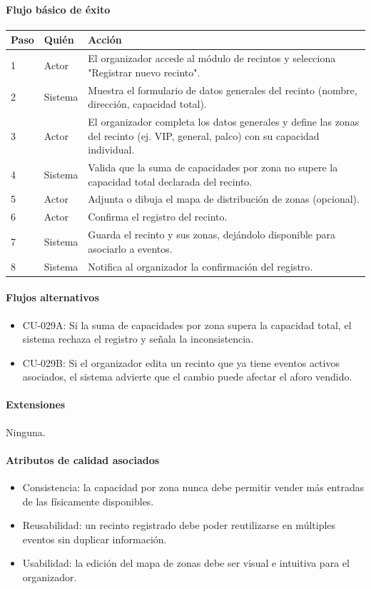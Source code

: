 \paragraph{Flujo básico de éxito}
\begin{longtable}{P{1.1cm}P{1.8cm}P{10.5cm}}
\toprule
\textbf{Paso} & \textbf{Quién} & \textbf{Acción}\\
\midrule
{} & Actor & El organizador accede al módulo de recintos y selecciona "Registrar nuevo recinto".\\
2 & Sistema & Muestra el formulario de datos generales del recinto (nombre, dirección, capacidad total).\\
3 & Actor & El organizador completa los datos generales y define las zonas del recinto (ej. VIP, general, palco) con su capacidad individual.\\
4 & Sistema & Valida que la suma de capacidades por zona no supere la capacidad total declarada del recinto.\\
5 & Actor & Adjunta o dibuja el mapa de distribución de zonas (opcional).\\
6 & Actor & Confirma el registro del recinto.\\
7 & Sistema & Guarda el recinto y sus zonas, dejándolo disponible para asociarlo a eventos.\\
8 & Sistema & Notifica al organizador la confirmación del registro.\\
\bottomrule
\end{longtable}

\paragraph{Flujos alternativos}
\begin{itemize}[leftmargin=1.4em, topsep=1pt]
  \item CU-029A: Si la suma de capacidades por zona supera la capacidad total, el sistema rechaza el registro y señala la inconsistencia.
  \item CU-029B: Si el organizador edita un recinto que ya tiene eventos activos asociados, el sistema advierte que el cambio puede afectar el aforo vendido.
\end{itemize}

\paragraph{Extensiones}
Ninguna.

\paragraph{Atributos de calidad asociados}
\begin{itemize}[leftmargin=1.4em, topsep=1pt]
  \item Consistencia: la capacidad por zona nunca debe permitir vender más entradas de las físicamente disponibles.
  \item Reusabilidad: un recinto registrado debe poder reutilizarse en múltiples eventos sin duplicar información.
  \item Usabilidad: la edición del mapa de zonas debe ser visual e intuitiva para el organizador.
\end{itemize}

